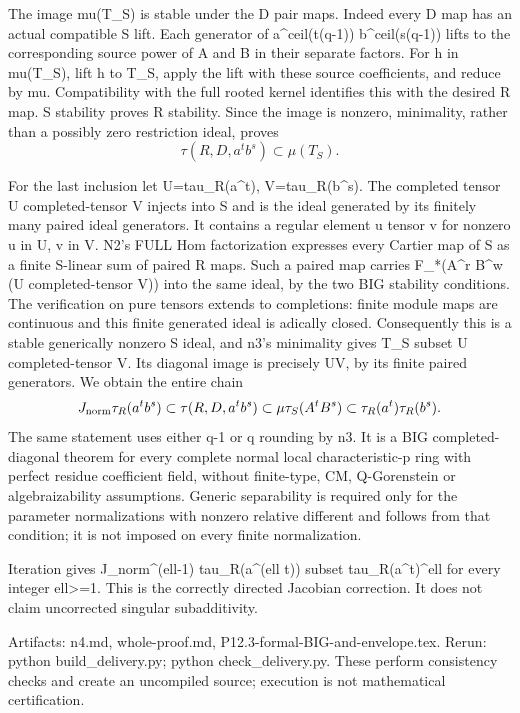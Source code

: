 \documentclass[11pt]{article}
\begin{document}
The image mu(T\_S) is stable under the D pair maps. Indeed every D map has an actual compatible S lift. Each generator of a\textasciicircum{}ceil(t(q-1)) b\textasciicircum{}ceil(s(q-1)) lifts to the corresponding source power of A and B in their separate factors. For h in mu(T\_S), lift h to T\_S, apply the lift with these source coefficients, and reduce by mu. Compatibility with the full rooted kernel identifies this with the desired R map. S stability proves R stability. Since the image is nonzero, minimality, rather than a possibly zero restriction ideal, proves
\[
\tau(R,D,a^t b^s)\subset\mu(T_S).
\]

For the last inclusion let U=tau\_R(a\textasciicircum{}t), V=tau\_R(b\textasciicircum{}s). The completed tensor U completed-tensor V injects into S and is the ideal generated by its finitely many paired ideal generators. It contains a regular element u tensor v for nonzero u in U, v in V. N2's FULL Hom factorization expresses every Cartier map of S as a finite S-linear sum of paired R maps. Such a paired map carries F\_*(A\textasciicircum{}r B\textasciicircum{}w (U completed-tensor V)) into the same ideal, by the two BIG stability conditions. The verification on pure tensors extends to completions: finite module maps are continuous and this finite generated ideal is adically closed. Consequently this is a stable generically nonzero S ideal, and n3's minimality gives T\_S subset U completed-tensor V. Its diagonal image is precisely UV, by its finite paired generators. We obtain the entire chain
\[
J_{\rm norm}\tau_R(a^t b^s)
\subset\tau(R,D,a^t b^s)
\subset\mu\tau_S(A^t B^s)
\subset\tau_R(a^t)\tau_R(b^s).
\]
The same statement uses either q-1 or q rounding by n3. It is a BIG completed-diagonal theorem for every complete normal local characteristic-p ring with perfect residue coefficient field, without finite-type, CM, Q-Gorenstein or algebraizability assumptions. Generic separability is required only for the parameter normalizations with nonzero relative different and follows from that condition; it is not imposed on every finite normalization.

Iteration gives J\_norm\textasciicircum{}(ell-1) tau\_R(a\textasciicircum{}(ell t)) subset tau\_R(a\textasciicircum{}t)\textasciicircum{}ell for every integer ell>=1. This is the correctly directed Jacobian correction. It does not claim uncorrected singular subadditivity.

Artifacts: n4.md, whole-proof.md, P12.3-formal-BIG-and-envelope.tex. Rerun: python build\_delivery.py; python check\_delivery.py. These perform consistency checks and create an uncompiled source; execution is not mathematical certification.
\end{document}
